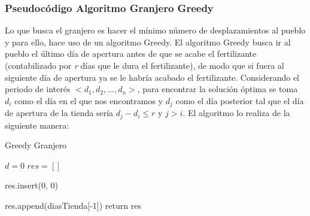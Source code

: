     \subsubsection{Pseudocódigo Algoritmo Granjero Greedy}
    Lo que busca el granjero es hacer el mínimo número de desplazamientos al pueblo y para ello, hace uso de un algoritmo Greedy. El algoritmo Greedy busca ir al pueblo el último día de apertura antes de que se acabe el fertilizante (contabilizado por \textit{r} días que le dura el fertilizante), de modo que si fuera al siguiente día de apertura ya se le habría acabado el fertilizante. Considerando el periodo de interés \(<d_{1}, d_{2}, ..., d_{n}>\), para encontrar la solución óptima se toma \(d_{i}\) como el día en el que nos encontramos y \(d_{j}\) como el día posterior tal que el día de apertura de la tienda sería \(d_{j} - d_{i} \leq r\) y \(j > i\). El algoritmo lo realiza de la siguiente manera: 
        \begin{algorithm}
            \caption{Greedy Granjero
            }\label{alg:two}
            
                $d = 0$\;
                $res = []$\;


                { 
                    res.insert(0, 0)\;
                }

                res.append(diasTienda[-1])\;
                return res\;
            
        \end{algorithm}
        
        
        
        
